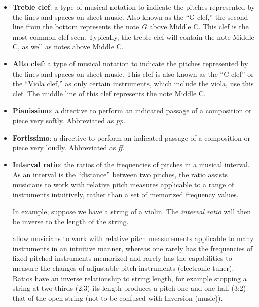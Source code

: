 \begin{itemize}
    \item {\textbf{Treble clef}: a type of musical notation to indicate the pitches represented by the lines and spaces on sheet music. Also known as the ``G-clef,'' the second line from the bottom represents the note \textit{G} above Middle C. This clef is the most common clef seen. Typically, the treble clef will contain the note Middle C, as well as notes above Middle C.}
    \item {\textbf{Alto clef}: a type of musical notation to indicate the pitches represented by the lines and spaces on sheet music. This clef is also known as the ``C-clef'' or the ``Viola clef,'' as only certain instruments, which include the viola, use this clef. The middle line of this clef represents the note Middle C.}
    \item {\textbf{Pianissimo}: a directive to perform an indicated passage of a composition or piece very softly. Abbreviated as \textit{pp}.}
    \item {\textbf{Fortissimo}: a directive to perform an indicated passage of a composition or piece very loudly. Abbreviated as \textit{ff}.}
    \item {\textbf{Interval ratio}: the ratios of the frequencies of pitches in a musical interval. As an interval is the ``distance'' between two pitches, the ratio assists musicians to work with relative pitch measures applicable to a range of instruments intuitively, rather than a set of memorized frequency values.}
    
    In example, suppose we have a string of a violin. The \textit{interval ratio} will then be inverse to the length of the string. 
    
     allow musicians to work with relative pitch measurements applicable to many instruments in an intuitive manner, whereas one rarely has the frequencies of fixed pitched instruments memorized and rarely has the capabilities to measure the changes of adjustable pitch instruments (electronic tuner). Ratios have an inverse relationship to string length, for example stopping a string at two-thirds (2:3) its length produces a pitch one and one-half (3:2) that of the open string (not to be confused with Inversion (music)).
    
    
\end{itemize}